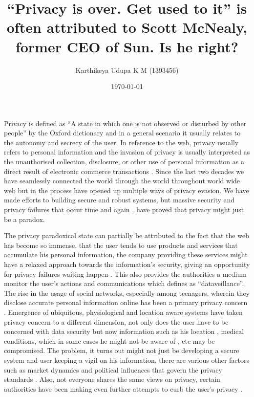 \documentclass[12pt]{article}
\title{``Privacy is over. Get used to it'' is often attributed to Scott McNealy, former CEO of Sun. Is he right?}
\author{Karthikeya Udupa K M (1393456)}
\date{\today}
\begin{document}
\maketitle
\noindent
Privacy is defined as ``A state in which one is not observed or disturbed by other people'' by the Oxford dictionary and in a general scenario it usually relates to the autonomy and secrecy of the user. In reference to the web, privacy usually refers to personal information and the invasion of privacy is usually interpreted as the unauthorised collection, disclosure, or other use of personal information as a direct result of electronic commerce transactions \cite{WANG:1998:CPC}. Since the last two decades we have seamlessly connected the world through the world throughout world wide web but in the process have opened up multiple ways of privacy evasion. We have made efforts to building secure and robust systems, but massive security and privacy failures that occur time and again \cite{TYL:2012:SB}, have proved that privacy might just be a paradox.

The privacy paradoxical state  can partially be attributed to the fact that the web has become so immense, that the user tends to use products and services that accumulate his personal information, the company providing these services might have a relaxed approach towards the information's security, giving an opportunity for privacy failures waiting happen \cite{MM:1990:YHNO}. This also provides the authorities a medium monitor the user's actions and communications which \cite{CLRK:1988:CPC} defines as ``dataveillance''. The rise in the usage of social networks, especially among teenagers, wherein they disclose accurate personal information online \cite{ACQ:2006:FB} has been a primary privacy concern \cite{BRNS:2006:APP,young2009information}. Emergence of ubiquitous, physiological and location aware systems have taken privacy concern to a different dimension, not only does the user have to be concerned with data security but now information such as his location \cite{ting2009}, medical conditions, which in some cases he might not be aware of \cite{fairclough2009fundamentals}, etc may be compromised. The problem, it turns out might not just be developing a secure system and user keeping a vigil on his information, there are various other factors such as market dynamics and political influences that govern the privacy standards \cite{anderson2001information}. Also, not everyone shares the same views on privacy, certain authorities have been making even further attempts to curb the user's privacy \cite{CISPA,PIPA}.
\end{document}
